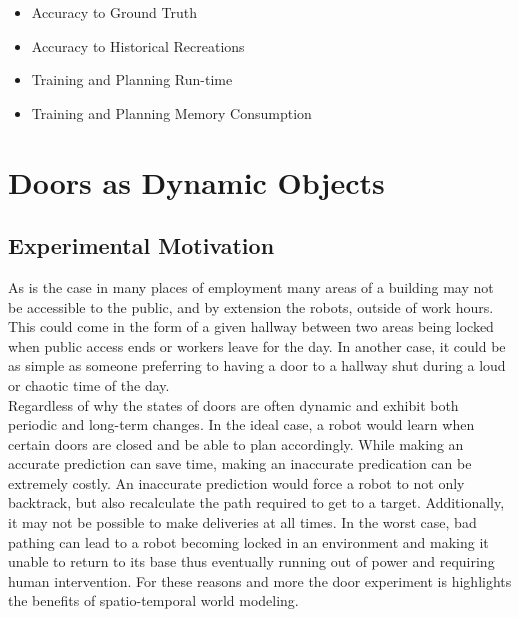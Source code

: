   \begin{itemize}

    \item Accuracy to Ground Truth

    \item Accuracy to Historical Recreations

    \item Training and Planning Run-time

    \item Training and Planning Memory Consumption

  \end{itemize}

  \section{ Doors as Dynamic Objects }

  \subsection{ Experimental Motivation }

  As is the case in many places of employment many areas of a building may not
  be accessible to the public, and by extension the robots, outside of work
  hours. This could come in the form of a given hallway between two areas being
  locked when public access ends or workers leave for the day. In another case, it could be as
  simple as someone preferring to having a door to a hallway shut during a loud
  or chaotic time of the day. \\

  Regardless of why the states of doors are often
  dynamic and exhibit both periodic and long-term changes. In the ideal case, a robot
  would learn when certain doors are closed and be able to plan accordingly.
  While making an accurate prediction can save time, making an inaccurate
  predication can be extremely costly. An inaccurate prediction would force a robot
  to not only backtrack, but also recalculate the path required to get to a
  target. Additionally, it may not be possible to make deliveries at all times.
  In the worst case, bad pathing can lead to a robot becoming locked in an
  environment and making it unable to return to its base thus eventually running out of power and
  requiring human intervention. For these reasons and more the door
  experiment is highlights the benefits of spatio-temporal world
  modeling. \\


